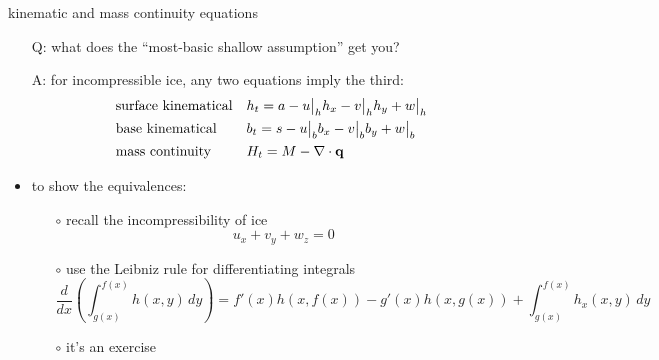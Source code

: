 \begin{frame}{kinematic and mass continuity equations}

\begin{itemize}
\item[Q:] what does the ``most-basic shallow assumption'' get you?
\item[A:] for incompressible ice, any two equations imply the third:
\small
\begin{align*}
&\text{surface kinematical} && h_t = a - u\big|_h h_x - v\big|_h h_y + w\big|_h  \\
&\text{base kinematical} && b_t = s - u\big|_b b_x - v\big|_b b_y + w\big|_b  \\
&\text{mass continuity} && H_t = M - \nabla\cdot \mathbf{q}
\end{align*}
\normalsize

\bigskip
\item to show the equivalences:
  \begin{itemize}
  \item[$\circ$]  recall the incompressibility of ice
    $$u_x + v_y + w_z = 0$$
  \item[$\circ$]  use the Leibniz rule for differentiating integrals
  {\scriptsize
    $$\frac{d}{dx}\left(\int_{g(x)}^{f(x)} h(x,y)\,dy\right) = f'(x) h(x,f(x)) - g'(x) h(x,g(x)) + \int_{g(x)}^{f(x)} h_x(x,y)\,dy$$}
  \item[$\circ$]  it's an exercise
  \end{itemize}
\end{itemize}
\end{frame}


